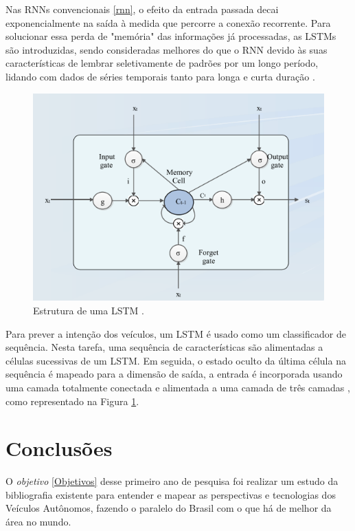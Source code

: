  \label{LSTM-s}

Nas RNNs convencionais \ref{rnn}, o efeito da entrada passada decai exponencialmente na saída à medida que percorre a conexão recorrente. Para solucionar essa perda de "memória" das informações já processadas, as LSTMs são introduzidas, sendo consideradas melhores do que o RNN devido às suas características de lembrar seletivamente de padrões por um longo período, lidando com dados de séries temporais tanto para longa e curta duração \cite{software-cnn}.

\begin{figure}[H]
\centering
\includegraphics[width=\textwidth]{Figures/LSTM.png}
\caption{Estrutura de uma LSTM \cite{software-cnn}.}
\label{LSTM}
\end{figure}



Para prever a intenção dos veículos, um LSTM é usado como um classificador de sequência. Nesta tarefa, uma sequência de características são alimentadas a células sucessivas de um LSTM. Em seguida, o estado oculto da última célula na sequência é mapeado para a dimensão de saída, a entrada é incorporada usando uma camada totalmente conectada e alimentada a uma camada de três camadas \cite{software-review}, como representado na Figura \ref{LSTM}.




\chapter{Conclusões} \label{concl}

O \textit{objetivo} \ref{Objetivos} desse primeiro ano de pesquisa foi realizar um estudo da bibliografia existente para entender e mapear as perspectivas e tecnologias dos Veículos Autônomos, fazendo o paralelo do Brasil com o que há de melhor da área no mundo. 

